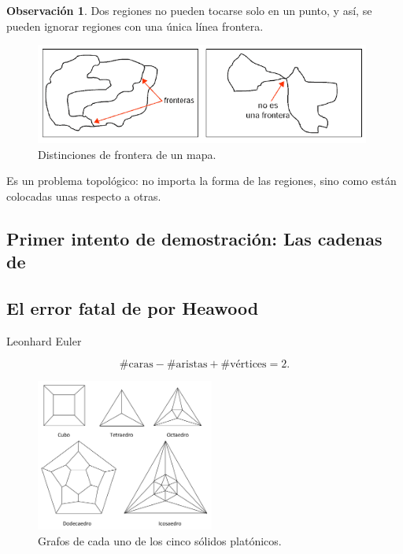 \documentclass[spanish,utf8]{beamer}
\theoremstyle{definition}
\newtheorem{remark}{Observación}
\begin{document}
\begin{frame}{\insertsubsection}
\begin{remark}{}
	Dos regiones no pueden tocarse solo en un punto, y así, se pueden ignorar regiones con una única línea frontera.
\end{remark}

\begin{figure}[H]
\centering
\includegraphics[height=3.3cm]{fronteras.png}
\caption{Distinciones de frontera de un mapa.}
\end{figure}

Es un problema topológico: no importa la forma de las regiones, sino como están colocadas unas respecto a otras.
\end{frame}

\subsection{Primer intento de demostración: Las cadenas de \citeauthor{kempe}}

\subsection{El error fatal de \citeauthor{kempe} por Heawood}

\begin{frame}{\insertsubsection}\transblindsvertical
Leonhard Euler
\begin{theorem}
$$
\#\text{caras} - \#\text{aristas} + \#\text{vértices} = 2.
$$
\end{theorem}

\begin{figure}[H]
\centering
\includegraphics[height=5cm]{poliedros2.jpg}
\caption{Grafos de cada uno de los cinco sólidos platónicos.}
\end{figure}

\end{frame}
\end{document}
